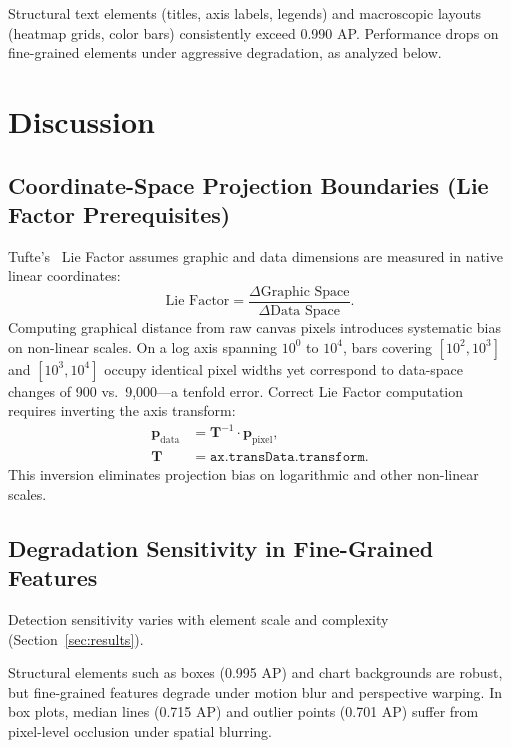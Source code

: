 \documentclass[11pt,twocolumn]{article}
\begin{document}
Structural text elements (titles, axis labels, legends) and macroscopic layouts (heatmap grids, color bars) consistently exceed 0.990 AP. Performance drops on fine-grained elements under aggressive degradation, as analyzed below.

\section{Discussion}\label{sec:discussion}

\subsection{Coordinate-Space Projection Boundaries (Lie Factor Prerequisites)}\label{sec:liefactor}

Tufte's~\cite{tufte2001} Lie Factor assumes graphic and data dimensions are measured in native linear coordinates:
\begin{equation}\label{eq:lie}
  \text{Lie Factor} = \frac{\Delta\text{Graphic Space}}{\Delta\text{Data Space}}.
\end{equation}
Computing graphical distance from raw canvas pixels introduces systematic bias on non-linear scales. On a log axis spanning $10^0$ to $10^4$, bars covering $[10^2,10^3]$ and $[10^3,10^4]$ occupy identical pixel widths yet correspond to data-space changes of 900 vs.\ 9{,}000---a tenfold error. Correct Lie Factor computation requires inverting the axis transform:
\begin{align}\label{eq:lie_inv}
  \mathbf{p}_{\text{data}} &= \mathbf{T}^{-1}\cdot\mathbf{p}_{\text{pixel}}, \nonumber\\
  \mathbf{T} &= \texttt{ax.transData.transform}.
\end{align}
This inversion eliminates projection bias on logarithmic and other non-linear scales.

\subsection{Degradation Sensitivity in Fine-Grained Features}\label{sec:sensitivity}

Detection sensitivity varies with element scale and complexity (Section~\ref{sec:results}).

Structural elements such as boxes (0.995 AP) and chart backgrounds are robust, but fine-grained features degrade under motion blur and perspective warping. In box plots, median lines (0.715 AP) and outlier points (0.701 AP) suffer from pixel-level occlusion under spatial blurring.
\end{document}
